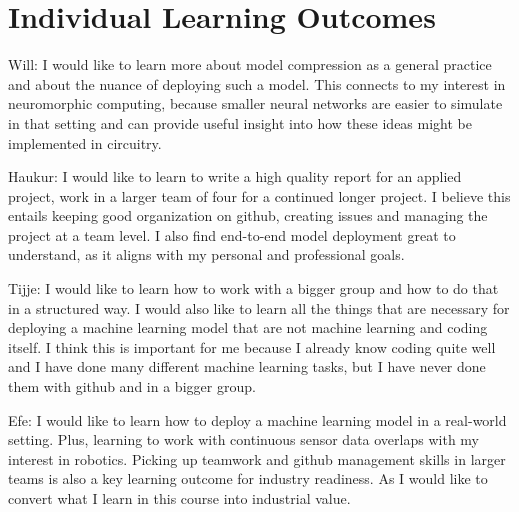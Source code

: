 \section{Individual Learning Outcomes}

Will: I would like to learn more about model compression as a general practice and about the nuance of deploying such a model. This connects to my interest in neuromorphic computing, because smaller neural networks are easier to simulate in that setting and can provide useful insight into how these ideas might be implemented in circuitry.


Haukur: I would like to learn to write a high quality report for an applied project, work in a larger team of four for a continued longer project. I believe this entails keeping good organization on github, creating issues and managing the project at a team level. I also find end-to-end model deployment great to understand, as it aligns with my personal and professional goals.


Tijje: I would like to learn how to work with a bigger group and how to do that in a structured way. I would also like to learn all the things that are necessary for deploying a machine learning model that are not machine learning and coding itself. I think this is important for me because I already know coding quite well and I have done many different machine learning tasks, but I have never done them with github and in a bigger group.


Efe: I would like to learn how to deploy a machine learning model in a real-world setting. Plus, learning to work with continuous sensor data overlaps with my interest in robotics. Picking up teamwork and github management skills in larger teams is also a key learning outcome for industry readiness. As I would like to convert what I learn in this course into industrial value.